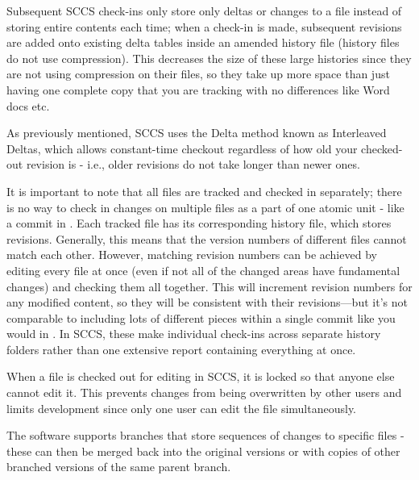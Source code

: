 Subsequent SCCS check-ins only store only deltas or changes to a file instead of storing entire contents each time; when a check-in is made, subsequent revisions are added onto existing delta tables inside an amended history file (history files do not use compression). This decreases the size of these large histories since they are not using compression on their files, so they take up more space than just having one complete copy that you are tracking with no differences like Word docs etc.
\smallskip

As previously mentioned, SCCS uses the Delta method known as Interleaved Deltas, which allows constant-time checkout regardless of how old your checked-out revision is - i.e., older revisions do not take longer than newer ones.
\smallskip

It is important to note that all files are tracked and checked in separately; there is no way to check in changes on multiple files as a part of one atomic unit - like a commit in . Each tracked file has its corresponding history file, which stores revisions. Generally, this means that the version numbers of different files cannot match each other. However, matching revision numbers can be achieved by editing every file at once (even if not all of the changed areas have fundamental changes) and checking them all together. This will increment revision numbers for any modified content, so they will be consistent with their revisions—but it's not comparable to including lots of different pieces within a single commit like you would in . In SCCS, these make individual check-ins across separate history folders rather than one extensive report containing everything at once.
\smallskip

When a file is checked out for editing in SCCS, it is locked so that anyone else cannot edit it. This prevents changes from being overwritten by other users and limits development since only one user can edit the file simultaneously.
\smallskip

The software supports branches that store sequences of changes to specific files - these can then be merged back into the original versions or with copies of other branched versions of the same parent branch.


